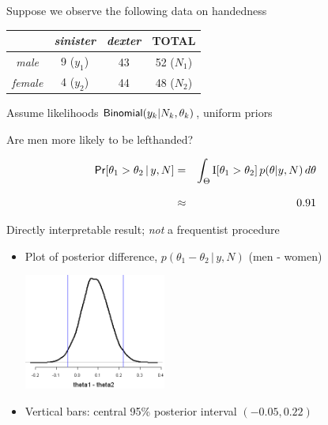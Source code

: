 \documentclass[10pt]{report}
\begin{document}
\vspace*{-4pt}
\begin{itemize}
\item Suppose we observe the following data on handedness
\begin{center}
{\small
\begin{tabular}{c|c|c||c}
     & {\slshape sinister} & {\slshape dexter} & TOTAL
\\ \hline \hline
{\slshape male} & 9 ($y_1$) & 43 & 52 ($N_1$)
\\
{\slshape female} & 4 ($y_2$) & 44 & 48 ($N_2$)
\end{tabular}
}
\end{center}
\item Assume likelihoods $\text{\sf Binomial}(y_k|N_k,\theta_k)$, uniform
  priors
\item Are men more likely to be lefthanded?
{\small
\begin{eqnarray*}
\text{\sf Pr}[\theta_1 > \theta_2 \, | \, y, N]
& = & 
\int_{\Theta} \text{I}[\theta_1 > \theta_2] \, p(\theta|y,N) \, d\theta
\\[8pt]
& \approx &  0.91
\end{eqnarray*}
\item Directly interpretable result; \emph{not} a frequentist procedure
}
\end{itemize}


\begin{itemize}
\item Plot of posterior difference, $p(\theta_1 - \theta_2 \, | \, y,
  N)$ (men - women)
\begin{center}
\includegraphics[height=1.5in]{img/bayesian-exact-posterior-handedness.png}
\end{center}
\item Vertical bars: central 95\% posterior interval $(-0.05,0.22)$
\end{itemize}


\end{document}
